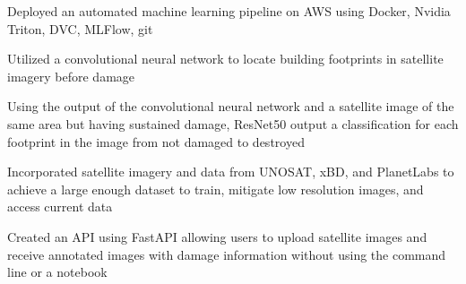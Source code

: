 \documentclass[letterpaper]{resume}
\begin{document}

\begin{compactitem}
\item Deployed an automated machine learning pipeline on AWS using Docker, Nvidia Triton, DVC, MLFlow, git
\item Utilized a convolutional neural network to locate building footprints in satellite imagery before damage
\item Using the output of the convolutional neural network and a satellite image of the same area but having sustained damage, ResNet50 output a classification for each footprint in the image from not damaged to destroyed
\item Incorporated satellite imagery and data from UNOSAT, xBD, and PlanetLabs to achieve a large enough dataset to train, mitigate low resolution images, and access current data
\item Created an API using FastAPI allowing users to upload satellite images and receive annotated images with damage information without using the command line or a notebook
\end{compactitem}

\end{document}
